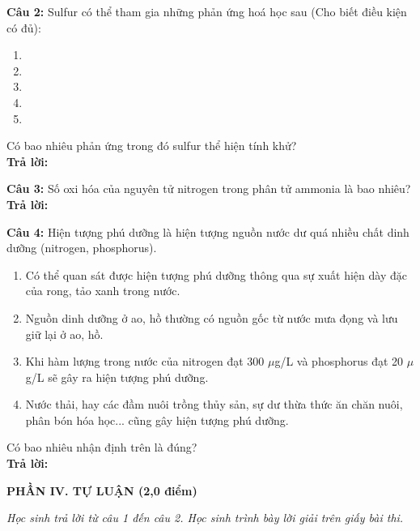 \documentclass[10.5pt,a4paper]{article}
\begin{document}
\vspace{2pt}
\textbf{Câu 2:} Sulfur có thể tham gia những phản ứng hoá học sau (Cho biết điều kiện có đủ):
\begin{enumerate}[label=(\arabic*), itemsep=1pt, topsep=1pt, leftmargin=1.2cm]
    \item {}
    \item {}
    \item {}
    \item {}
    \item {}
\end{enumerate}
Có bao nhiêu phản ứng trong đó sulfur thể hiện tính khử?\\
\textbf{Trả lời:} \dotfill

\vspace{2pt}
\textbf{Câu 3:} Số oxi hóa của nguyên tử nitrogen trong phân tử ammonia là bao nhiêu?\\
\textbf{Trả lời:} \dotfill

\vspace{2pt}
\textbf{Câu 4:} Hiện tượng phú dưỡng là hiện tượng nguồn nước dư quá nhiều chất dinh dưỡng (nitrogen, phosphorus).
\begin{enumerate}[label=\alph*), itemsep=1pt, topsep=1pt, leftmargin=0.8cm]
    \item Có thể quan sát được hiện tượng phú dưỡng thông qua sự xuất hiện dày đặc của rong, tảo xanh trong nước.
    \item Nguồn dinh dưỡng ở ao, hồ thường có nguồn gốc từ nước mưa đọng và lưu giữ lại ở ao, hồ.
    \item Khi hàm lượng trong nước của nitrogen đạt 300 $\mu$g/L và phosphorus đạt 20 $\mu$g/L sẽ gây ra hiện tượng phú dưỡng.
    \item Nước thải, hay các đầm nuôi trồng thủy sản, sự dư thừa thức ăn chăn nuôi, phân bón hóa học... cũng gây hiện tượng phú dưỡng.
\end{enumerate}
Có bao nhiêu nhận định trên là đúng?\\
\textbf{Trả lời:} \dotfill

\vspace{6pt}
{\color{myGreen}\large\bfseries PHẦN IV. TỰ LUẬN (2,0 điểm)}

\textit{Học sinh trả lời từ câu 1 đến câu 2. Học sinh trình bày lời giải trên giấy bài thi.}
\end{document}
